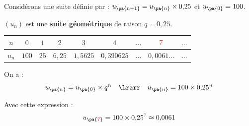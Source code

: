 \begin{ex}
	Considérons une suite définie par : $u_{\pa{n+1}}=u_{\pa{n}}\times 0{,}25$ et $u_{\pa{0}}=100$.

	$(u_n)$ est une \textbf{suite géométrique} de raison $q=0{,}25$.

	\begin{center}
		\begin{tabular}{|c|c|c|c|c|c|c|c|c}\hline
			\ccg $n$   & $0$   & $1$  & $2$      & $3$        & $4$          & $\dots$ & \ccg $\textcolor{red}{7}$ & $\dots$ \\ \hline
			\ccg $u_n$ & $100$ & $25$ & $6{,}25$ & $1{,}5625$ & $0{,}390625$ & $\dots$ & \ccg $0{,}0061\dots$      & $\dots$ \\ \hline
		\end{tabular}
	\end{center}

	On a :
	\[
		u_{\pa{n}}=u_{\pa{0}}\times q^{n} \quad\Lrarr\quad u_{\pa{n}}=100\times 0{,}25^{n}
	\]

	Avec cette expression :
	\[
		u_{\pa{\textcolor{red}{7}}} = 100\times 0{,}25^{\textcolor{red}{7}} \approx 0{,}0061
	\]
\end{ex}

